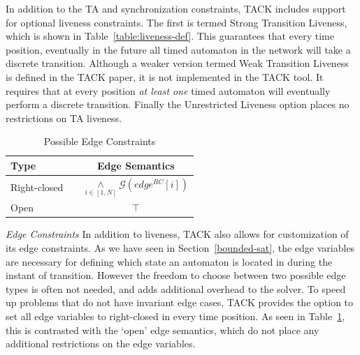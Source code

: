 \documentclass[a4paper,11pt]{report}
\theoremstyle{definition}
\begin{document}
In addition to the TA and synchronization constraints, TACK includes support for
optional liveness constraints. The first is termed Strong Transition Liveness,
which is shown in Table~\ref{table:liveness-def}. This guarantees that every
time position, eventually in the future all timed automaton in the network will
take a discrete transition. Although a weaker version termed Weak Transition
Liveness is defined in the TACK paper, it is not implemented in the TACK tool.
It requires that at every position \emph{at least one} timed automaton will
eventually perform a discrete transition. Finally the Unrestricted Liveness
option places no restrictions on TA liveness.

\begin{table}[h]
  \centering
  \begin{tabular}{l c c}
    \toprule
    \textbf{Type} &\quad\quad\quad\quad & \textbf{Edge Semantics} \\
    \midrule
    Right-closed & & $\underset{i \in [1,N]}{\land} \mathcal{G} (edge^{RC}[i])$ \\
    \midrule
    Open & & $\top$ \\
    \bottomrule
  \end{tabular}
  \caption{Possible Edge Constraints}
  \label{table:edge-def}
\end{table}

\emph{Edge Constraints} In addition to liveness, TACK also allows for
customization of its edge constraints. As we have seen in
Section~\ref{bounded-sat}, the edge variables are necessary for defining which
state an automaton is located in during the instant of transition. However the
freedom to choose between two possible edge types is often not needed, and adds
additional overhead to the solver. To speed up problems that do not have
invariant edge cases, TACK provides the option to set all edge variables to
right-closed in every time position. As seen in Table~\ref{table:edge-def}, this
is contrasted with the `open' edge semantics, which do not place any additional
restrictions on the edge variables.
\end{document}
